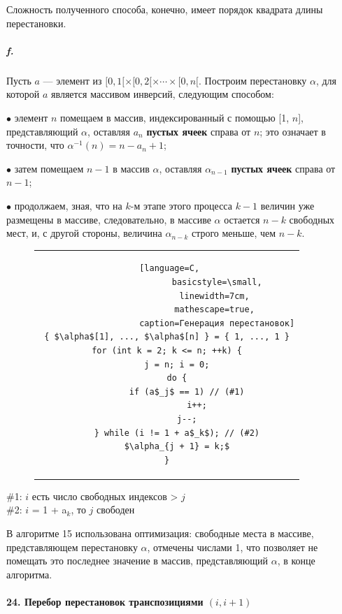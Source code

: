 \documentclass{../../template/mai_book}
\begin{document}
Сложность полученного способа, конечно, имеет порядок квадрата длины перестановки.

\newpage


\subparagraph{f.} Пусть $a$ — элемент из $[0, 1[ \times [0, 2[ \times \cdots \times [0, n[$. Построим перестановку $\alpha$, для которой $a$ является массивом инверсий, следующим способом: \newline

$\bullet$ элемент $n$ помещаем в массив, индексированный с помощью [1, $n$], представляющий $\alpha$, оставляя $a_n$ \textbf{пустых ячеек} справа от $n$; это означает в точности, что $\alpha^{-1}(n) = n - a_n + 1$;

$\bullet$ затем помещаем $n - 1$ в массив $\alpha$, оставляя $\alpha_{n - 1}$ \textbf{пустых ячеек} справа от $n - 1$;

$\bullet$ продолжаем, зная, что на $k$-м этапе этого процесса $k - 1$ величин уже размещены в массиве, следовательно, в массиве $\alpha$ остается $n - k$ свободных мест, и, с другой стороны, величина $\alpha_{n - k}$ строго меньше, чем $n - k$. \newline

\noindent
\begin{figure}[htp]
\centering
\begin{tabular}{c}
\begin{lstlisting} [language=C,
					basicstyle=\small,
					linewidth=7cm, 
					mathescape=true, 
					caption=Генерация перестановок]
{ $\alpha$[1], ..., $\alpha$[n] } = { 1, ..., 1 }
for (int k = 2; k <= n; ++k) {
	j = n; i = 0;
	do {
		if (a$_j$ == 1) // (#1)
			i++;
		j--;
	} while (i != 1 + a$_k$); // (#2)
	$\alpha_{j + 1} = k;$
}
\end{lstlisting}
\end{tabular}
\end{figure}

\begin{leftbar}
\noindent
\#1: \quad $i$ есть число свободных индексов > $j$
\\
\#2: \quad $i$ = 1 + a$_k$, то $j$ свободен
\end{leftbar}

В алгоритме 15 использована оптимизация: свободные места в массиве, представляющем перестановку $\alpha$, отмечены числами 1, что позволяет не помещать это последнее значение в массив, представляющий $\alpha$, в конце алгоритма.

\paragraph{24. Перебор перестановок транспозициями $(i, i + 1)$}
\end{document}
